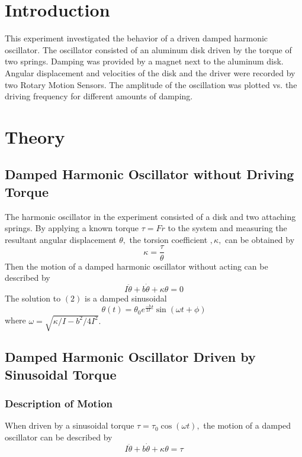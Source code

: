 

\rmfamily

\section{Introduction}

This experiment investigated the behavior of a driven damped harmonic oscillator. The oscillator consisted of an aluminum disk driven by the torque of two springs. Damping was provided by a magnet next to the aluminum disk. Angular displacement and velocities of the disk and the driver were recorded by two Rotary Motion Sensors. The amplitude of the oscillation was plotted vs. the driving frequency for different amounts of damping.

\section{Theory}

\subsection{Damped Harmonic Oscillator without Driving Torque}
The harmonic oscillator in the experiment consisted of a disk and two attaching springs. By applying a known torque $\tau=Fr$ to the system and measuring the resultant angular displacement $\theta,$ the torsion coefficient $,\kappa,$ can be obtained by
\begin{equation}
\kappa=\frac{\tau}{\theta}
\end{equation}
Then the motion of a damped harmonic oscillator without acting can be described by
\begin{equation}
I \ddot\theta+b \dot\theta + \kappa \theta = 0
\end{equation}
The solution to $(2)$ is a damped sinusoidal
\begin{equation}
\theta(t) = \theta_0 e^{\frac{-b}{2I}t}\sin(\omega t+\phi)
\end{equation}
where $\omega = \sqrt{\kappa/ I-{b^2}/{4I^2}}.$

\subsection{Damped Harmonic Oscillator Driven by Sinusoidal Torque}
\subsubsection{Description of Motion}
When driven by a sinusoidal torque $\tau = \tau_0\cos(\omega t),$ the motion of a damped oscillator can be described by
\begin{equation}
I \ddot\theta+b \dot\theta + \kappa \theta = \tau
\end{equation}

